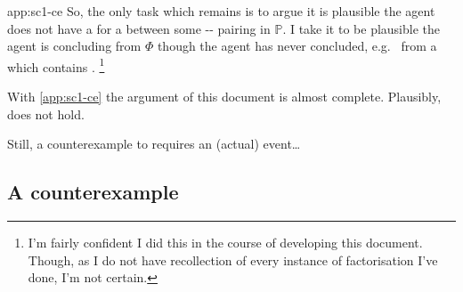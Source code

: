 \begin{note}
\begin{dets}{app:sc1-ce}
  So, the only task which remains is to argue it is plausible the agent does not have a \wit{} for a \fingfr{} between some -- pairing in \(\mathbb{P}\).
  I take it to be plausible the agent is concluding  from \(\Phi\) though the agent has never concluded, e.g.\  from a \pool{} which contains .%
  \footnote{
    I'm fairly confident I did this in the course of developing this document.
    Though, as I do not have recollection of every instance of factorisation I've done, I'm not certain.
  }
  \end{dets}
\end{note}


\begin{note}
  With \autoref{app:sc1-ce} the argument of this document is almost complete.
  Plausibly, \issueInclusion{} does not hold.

  Still, a counterexample to \issueInclusion{} requires an (actual) event\dots
\end{note}





\subsection{A counterexample}
\label{sec:counterexample}


